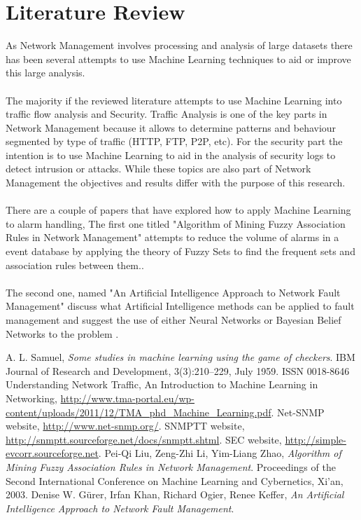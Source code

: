 \documentclass[10pt,a4paper]{article}
\begin{document}
  \section{Literature Review}
As Network Management involves processing and analysis of large datasets there has been several attempts to use Machine Learning techniques to aid or improve this large analysis.
\\\\
The majority if the reviewed literature attempts to use Machine Learning into traffic flow analysis and Security. Traffic Analysis is one of the key parts in Network Management because it allows to determine patterns and behaviour segmented by type of traffic (HTTP, FTP, P2P, etc). For the security part the intention is to use Machine Learning to aid in the analysis of security logs to detect intrusion or attacks. While these topics are also part of Network Management the objectives and results differ with the purpose of this research.
\\\\
There are a couple of papers that have explored how to apply Machine Learning to alarm handling, The first one titled "Algorithm of Mining Fuzzy Association Rules in Network Management" attempts to reduce the volume of alarms in a event database by applying the theory of Fuzzy Sets to find the frequent sets and association rules between them.\cite{liu2003}.
\\\\
The second one, named "An Artificial Intelligence Approach to Network Fault Management" discuss what Artificial Intelligence methods can be applied to fault management and suggest the use of either Neural Networks or Bayesian Belief Networks to the problem \cite{kefferundef}.

\newpage

\begin{thebibliography}{9}

 A. L. Samuel,
        \emph{Some studies in machine learning using the game of checkers}.
        IBM Journal of Research and Development, 3(3):210–229, July 1959. ISSN 0018-8646
Understanding Network Traffic, An Introduction to Machine Learning in Networking,  \url{http://www.tma-portal.eu/wp-content/uploads/2011/12/TMA_phd_Machine_Learning.pdf}.
Net-SNMP website, \url{http://www.net-snmp.org/}.
SNMPTT website, \url{http://snmptt.sourceforge.net/docs/snmptt.shtml}.
SEC website, \url{http://simple-evcorr.sourceforge.net}.
  Pei-Qi Liu, Zeng-Zhi Li, Yim-Liang Zhao,
  \emph{Algorithm of Mining Fuzzy Association Rules in Network Management}.
  Proceedings of the Second International Conference on Machine Learning and Cybernetics, Xi'an,
  2003.
  Denise W. Gürer, Irfan Khan, Richard Ogier, Renee Keffer,
  \emph{An Artificial Intelligence Approach to Network Fault Management}.
  
\end{thebibliography}
    
\end{document}
